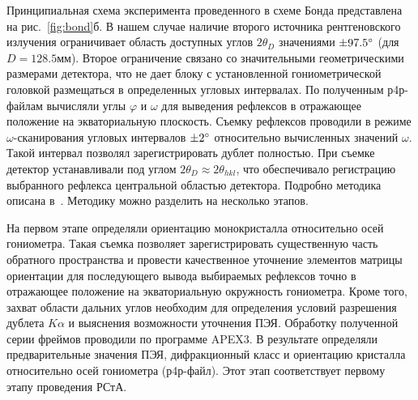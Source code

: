Принципиальная схема эксперимента проведенного в схеме Бонда представлена на рис.~\ref{fig:bond}б.
В нашем случае наличие второго источника рентгеновского излучения ограничивает область доступных углов $2\theta_D$ значениями $\pm 97.5^\circ$ (для $D = 128.5\unit{мм}$).
Второе ограничение связано со значительными геометрическими размерами детектора, что не дает блоку с установленной гониометрической головкой размещаться в определенных угловых интервалах.
По полученным р4р-файлам вычисляли углы $\varphi$ и $\omega$ для выведения рефлексов в отражающее положение на экваториальную плоскость.
Съемку рефлексов проводили в режиме $\omega$-сканирования угловых интервалов $\pm 2^\circ$ относительно вычисленных значений $\omega$.
Такой интервал позволял зарегистрировать дублет полностью.
При съемке детектор устанавливали под углом $2\theta_D \approx 2\theta_{hkl}$, что обеспечивало регистрацию выбранного рефлекса центральной областью детектора.
Подробно методика описана в~\cite{Kudryavtsev:2024:YEu,Kudryavtsev:2024:eccentr}.
Методику можно разделить на несколько этапов.

На первом этапе определяли ориентацию монокристалла относительно осей гониометра.
Такая съемка позволяет зарегистрировать существенную часть обратного пространства и провести качественное уточнение элементов матрицы ориентации для последующего вывода выбираемых рефлексов точно в отражающее положение на экваториальную окружность гониометра.
Кроме того, захват области дальних углов необходим для определения условий разрешения дублета $K\alpha$ и выяснения возможности уточнения ПЭЯ.
Обработку полученной серии фреймов проводили по программе APEX3.
В результате определяли предварительные значения ПЭЯ, дифракционный класс и ориентацию кристалла относительно осей гониометра (р4р-файл).
Этот этап соответствует первому этапу проведения РСтА.

